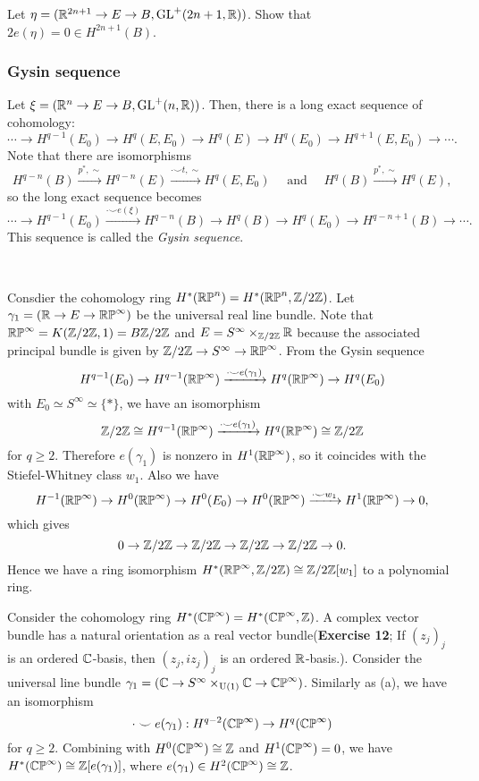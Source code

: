 \documentclass{../../../small}
\begin{document}
\begin{exe*}[11]
Let $\eta=(\mathbb{R}^{2n+1}\to E\to B,\mathrm{GL}^+(2n+1,\mathbb{R}))$.
Show that $2e(\eta)=0\in H^{2n+1}(B)$.	
\end{exe*}

\subsubsection*{Gysin sequence}
Let $\xi=(\mathbb{R}^n\to E\to B,\mathrm{GL}^+(n,\mathbb{R}))$.
Then, there is a long exact sequence of cohomology:
\[\cdots\to H^{q-1}(E_0)\to H^q(E,E_0)\to H^q(E)\to H^q(E_0)\to H^{q+1}(E,E_0)\to\cdots.\]
Note that there are isomorphisms
\[H^{q-n}(B)\xrightarrow{p^*,\sim}H^{q-n}(E)\xrightarrow{\cdot\smile t,\sim}H^q(E,E_0)\quad\text{ and }\quad H^q(B)\xrightarrow{p^*,\sim}H^q(E),\]
so the long exact sequence becomes
\[\cdots\to H^{q-1}(E_0)\xrightarrow{\cdot\smile e(\xi)} H^{q-n}(B)\to H^q(B)\to H^q(E_0)\to H^{q-n+1}(B)\to\cdots.\]
This sequence is called the \emph{Gysin sequence}.

\begin{ex*}\,
\begin{parts}
\item
Consdier the cohomology ring $H^*(\mathbb{RP}^n)=H^*(\mathbb{RP}^n,\mathbb{Z}/2\mathbb{Z})$.
Let $\gamma_1=(\mathbb{R}\to E\to\mathbb{RP}^\infty)$ be the universal real line bundle.
Note that $\mathbb{RP}^\infty=K(\mathbb{Z}/2\mathbb{Z},1)=B\mathbb{Z}/2\mathbb{Z}$ and $E=S^\infty\times_{\mathbb{Z}/2\mathbb{Z}}\mathbb{R}$ because the associated principal bundle is given by $\mathbb{Z}/2\mathbb{Z}\to S^\infty\to\mathbb{RP}^\infty$.
From the Gysin sequence
\[H^{q-1}(E_0)\to H^{q-1}(\mathbb{RP}^\infty)\xrightarrow{\cdot\smile e(\gamma_1)}H^q(\mathbb{RP}^\infty)\to H^q(E_0)\]
with $E_0\simeq S^\infty\simeq\{*\}$, we have an isomorphism
\[\mathbb{Z}/2\mathbb{Z}\cong H^{q-1}(\mathbb{RP}^\infty)\xrightarrow{\cdot\smile e(\gamma_1)}H^q(\mathbb{RP}^\infty)\cong\mathbb{Z}/2\mathbb{Z}\]
for $q\ge2$.
Therefore $e(\gamma_1)$ is nonzero in $H^1(\mathbb{RP}^\infty)$, so it coincides with the Stiefel-Whitney class $w_1$.
Also we have
\[H^{-1}(\mathbb{RP}^\infty)\to H^0(\mathbb{RP}^\infty)\to H^0(E_0)\to H^0(\mathbb{RP}^\infty)\xrightarrow{\cdot\smile w_1}H^1(\mathbb{RP}^\infty)\to0,\]
which gives
\[0\to\mathbb{Z}/2\mathbb{Z}\to\mathbb{Z}/2\mathbb{Z}\to\mathbb{Z}/2\mathbb{Z}\to\mathbb{Z}/2\mathbb{Z}\to0.\]
Hence we have a ring isomorphism $H^*(\mathbb{RP}^\infty,\mathbb{Z}/2\mathbb{Z})\cong\mathbb{Z}/2\mathbb{Z}[w_1]$ to a polynomial ring.

\item
Consider the cohomology ring $H^*(\mathbb{CP}^\infty)=H^*(\mathbb{CP}^\infty,\mathbb{Z})$.
A complex vector bundle has a natural orientation as a real vector bundle(\textbf{Exercise 12}; If $(z_j)_j$ is an ordered $\mathbb{C}$-basis, then $(z_j,iz_j)_j$ is an ordered $\mathbb{R}$-basis.).
Consider the universal line bundle $\gamma_1=(\mathbb{C}\to S^\infty\times_{\mathrm{U}(1)}\mathbb{C}\to\mathbb{CP}^\infty)$.
Similarly as (a), we have an isomorphism
\[\cdot\smile e(\gamma_1):H^{q-2}(\mathbb{CP}^\infty)\to H^q(\mathbb{CP}^\infty)\]
for $q\ge2$.
Combining with $H^0(\mathbb{CP}^\infty)\cong\mathbb{Z}$ and $H^1(\mathbb{CP}^\infty)=0$, we have $H^*(\mathbb{CP}^\infty)\cong\mathbb{Z}[e(\gamma_1)]$, where $e(\gamma_1)\in H^2(\mathbb{CP}^\infty)\cong\mathbb{Z}$.
\end{parts}
\end{ex*}
\end{document}

